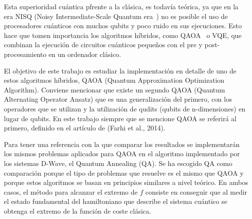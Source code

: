 
Esta superioridad cuántica pfrente a la clásica, es todavía teórica, ya que en la era NISQ (Noisy Intermediate-Scale Quantum era~\cite{Quantum_computing_in_the_NISQ_era_and_beyond}) no es posible el uso de procesadores cuánticos con muchos qubits y poco ruido  %
en sus ejecuciones.
Esto hace que tomen importancia los algoritmos híbridos, como QAOA~\cite{qaoa_paper_original} o VQE, que combinan la ejecución de circuitos cuánticos pequeños con el pre y post-procesamiento en un ordenador clásico.



El objetivo de este trabajo es estudiar la implementación en detalle de uno de estos algoritmos híbridos, QAOA (Quantum Approximation Optimization Algorithm).
Conviene mencionar que existe un segundo QAOA (Quantum Alternating Operator Ansatz)\cite{quantum_alternating_operator_ansatz} que es una generalización del primero, con los operadores que se utilizan y la utilización de qudits (qubits de n-dimensiones) en lugar de qubits.
En este trabajo siempre que se mencione QAOA se referirá al primero, definido en el artículo de (Farhi et al., 2014)\cite{qaoa_paper_original}.

Para tener una referencia con la que comparar los resultados se implementarán los mismos problemas aplicados para QAOA en el algoritmo implementado por los sistemas D-Wave, el Quantum Annealing (QA).
Se ha escogido QA como comparación porque el tipo de problemas que resuelve es el mismo que QAOA y porque estos algoritmos se basan en principios similares a nivel teórico.
En ambos casos, el método para alcanzar el extremo de $f$ consiste en conseguir que al medir el estado fundamental  %
del hamiltoniano que describe el sistema cuántico se obtenga el extremo de la función de coste clásica.

